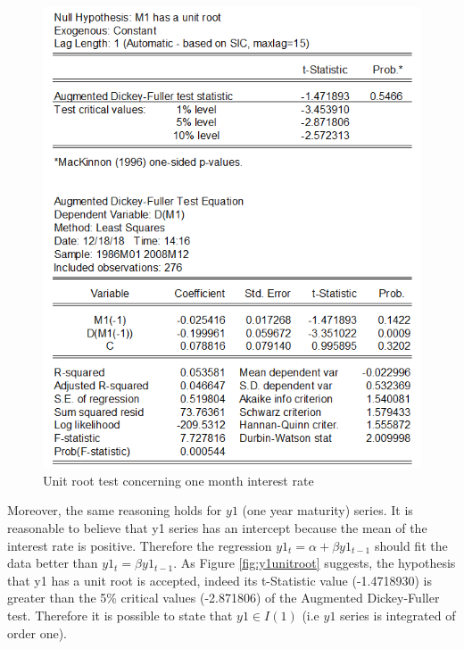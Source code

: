\documentclass[12pt]{article}
\begin{document}
\begin{figure}[H]
\centering
\includegraphics[scale=1]{m1_unit_root_test.PNG} 
\caption{Unit root test concerning one month interest rate \label{fig:m1unitroot} }
\end{figure}
\noindent Moreover, the same reasoning holds for $y1$ (one year maturity) series. It is reasonable to believe that y1 series has an intercept because the mean of the interest rate is positive. Therefore the regression $ y1_t = \alpha + \beta y1_{t-1}$ should fit the data better than  $ y1_t =  \beta y1_{t-1}$. As Figure \ref{fig:y1unitroot} suggests, the hypothesis that y1 has a unit root is accepted, indeed its t-Statistic value (-1.4718930) is greater than the 5\% critical values (-2.871806) of the Augmented Dickey-Fuller test.  Therefore it is possible to state that $y1 \in I(1)$ (i.e  $y1$ series is integrated of order one).
\end{document}
